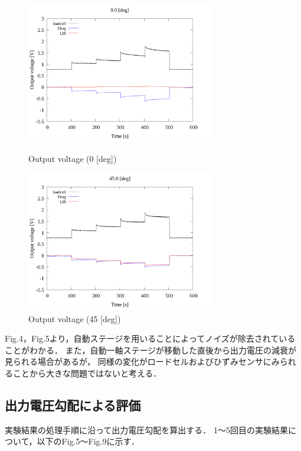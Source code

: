 \documentclass[twocolumn,a4j]{jsarticle}
\begin{document}
\begin{figure}[htbp]
    \footnotesize
    \begin{center}
        \includegraphics[width=82mm]{../../../02_workspace/result/2-1/plot/01-3_allsensors/01_allsensors_0.png}
        \caption{Output voltage (0 [deg])}
        \includegraphics[width=82mm]{../../../02_workspace/result/2-1/plot/01-3_allsensors/01_allsensors_450.png}
        \caption{Output voltage (45 [deg])}
    \end{center}
\end{figure}

\newpage
Fig.4，Fig.5より，自動ステージを用いることによってノイズが除去されていることがわかる．
また，自動一軸ステージが移動した直後から出力電圧の減衰が見られる場合があるが，
同様の変化がロードセルおよびひずみセンサにみられることから大きな問題ではないと考える．\\

\subsection{出力電圧勾配による評価}

実験結果の処理手順に沿って出力電圧勾配を算出する．
1～5回目の実験結果について，以下のFig.5～Fig.9に示す．
\end{document}
